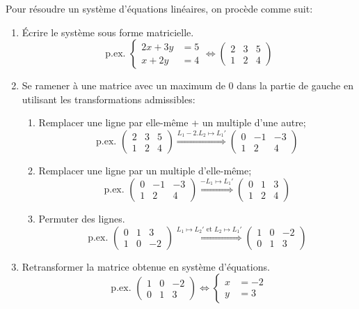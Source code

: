 
Pour résoudre un système d'équations linéaires, on procède comme suit:
\begin{enumerate}
	\item Écrire le système sous forme matricielle. \[\text{p.ex. } \begin{cases} 2x+3y &= 5 \\ x+2y &= 4 \end{cases} \Leftrightarrow \left(\begin{array}{cc|c} 2 & 3 & 5 \\ 1 & 2 & 4 \end{array}\right) \]
	\item Se ramener à une matrice avec un maximum de \( 0\) dans la partie de gauche en utilisant les transformations admissibles:
	      \begin{enumerate}
		      \item Remplacer une ligne par elle-même + un multiple d'une autre;
		            \[\text{p.ex. } \left(\begin{array}{cc|c} 2 & 3 & 5 \\ 1 & 2 & 4 \end{array}\right)  \stackrel{L_1  - 2. L_2 \mapsto L_1'}{\Longrightarrow} \left(\begin{array}{cc|c} 0 & -1 & -3 \\ 1 & 2 & 4 \end{array}\right) \]
		      \item Remplacer une ligne par un multiple d'elle-même;
		            \[\text{p.ex. } \left(\begin{array}{cc|c} 0 & -1 & -3 \\ 1 & 2 & 4 \end{array}\right)  \stackrel{-L_1  \mapsto L_1'}{\Longrightarrow} \left(\begin{array}{cc|c} 0 & 1 & 3 \\ 1 & 2 & 4 \end{array}\right) \]
		      \item Permuter des lignes.
		            \[\text{p.ex. } \left(\begin{array}{cc|c} 0 & 1 & 3 \\ 1 & 0 & -2 \end{array}\right)  \stackrel{L_1  \mapsto L_2' \text{ et } L_2  \mapsto L_1'}{\Longrightarrow} \left(\begin{array}{cc|c} 1 & 0 & -2 \\ 0 & 1 & 3  \end{array}\right) \]
	      \end{enumerate}
	\item Retransformer la matrice obtenue en système d'équations.
	      \[\text{p.ex. }  \left(\begin{array}{cc|c} 1 & 0 & -2 \\ 0 & 1 & 3  \end{array}\right) \Leftrightarrow \begin{cases} x &= -2 \\ y &= 3 \end{cases}  \]
\end{enumerate}

